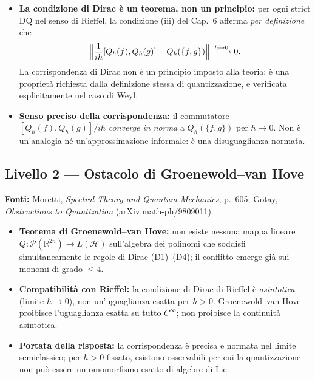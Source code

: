 \documentclass[12pt, a4paper]{article}
\newcommand{\fonti}[1]{%
	\begin{fontebox}
		\textcolor{fontecolor}{\footnotesize\textbf{Fonti:} #1}
	\end{fontebox}%
}
\begin{document}
	\begin{itemize}
		\item \textbf{La condizione di Dirac è un teorema, non un principio:} per ogni
		strict DQ nel senso di Rieffel, la condizione (iii) del Cap.\ 6 afferma
		\emph{per definizione} che
		\[
		\Bigl\|\frac{1}{i\hbar}[Q_\hbar(f), Q_\hbar(g)] - Q_\hbar(\{f,g\})\Bigr\|
		\xrightarrow{\hbar \to 0} 0.
		\]
		La corrispondenza di Dirac non è un principio imposto alla teoria:
		è una proprietà richiesta dalla definizione stessa di quantizzazione, e verificata
		esplicitamente nel caso di Weyl.
		\item \textbf{Senso preciso della corrispondenza:} il commutatore $[Q_\hbar(f),
		Q_\hbar(g)]/i\hbar$ \emph{converge in norma} a $Q_\hbar(\{f,g\})$ per
		$\hbar \to 0$. Non è un'analogia né un'approssimazione informale: è una
		disuguaglianza normata.
	\end{itemize}
	
	\subsection{Livello 2 --- Ostacolo di Groenewold--van Hove}
	
	\fonti{Moretti, \textit{Spectral Theory and Quantum Mechanics}, p.~605;
		Gotay, \textit{Obstructions to Quantization} (arXiv:math-ph/9809011).}
	
	\begin{itemize}
		\item \textbf{Teorema di Groenewold--van Hove:} non esiste nessuna mappa lineare
		$Q: \mathcal{P}(\mathbb{R}^{2n}) \to L(\mathcal{H})$ sull'algebra dei polinomi
		che soddisfi simultaneamente le regole di Dirac (D1)--(D4); il conflitto emerge
		già sui monomi di grado $\leq 4$.
		\item \textbf{Compatibilità con Rieffel:} la condizione di Dirac di Rieffel è
		\emph{asintotica} (limite $\hbar \to 0$), non un'uguaglianza esatta per $\hbar > 0$.
		Groenewold--van Hove proibisce l'uguaglianza esatta su tutto $C^\infty$; non
		proibisce la continuità asintotica.
		\item \textbf{Portata della risposta:} la corrispondenza è precisa e normata
		nel limite semiclassico; per $\hbar > 0$ fissato, esistono osservabili per cui
		la quantizzazione non può essere un omomorfismo esatto di algebre di Lie.
	\end{itemize}
	
\end{document}

